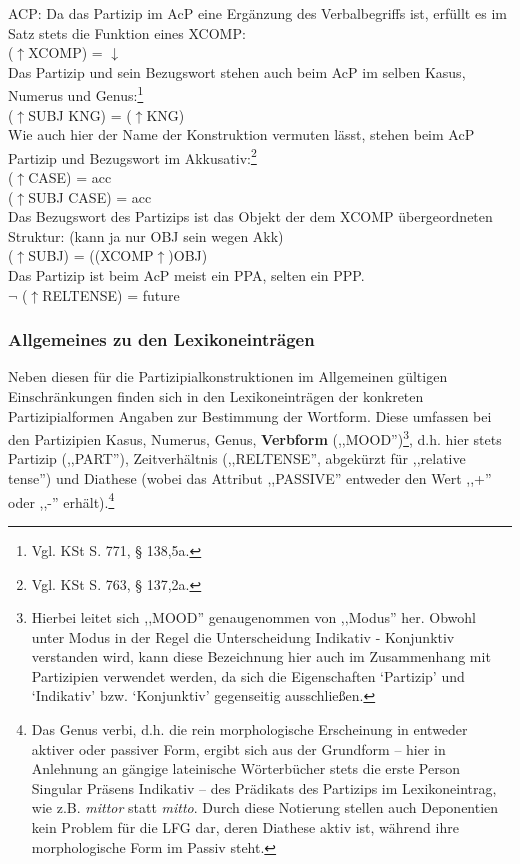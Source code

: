 \documentclass[12pt,a4paper]{article}
\begin{document}
ACP:
Da das Partizip im AcP eine Ergänzung des Verbalbegriffs ist, erfüllt es im Satz stets die Funktion eines XCOMP: \\
($\uparrow$XCOMP) = $\downarrow$ \\
Das Partizip und sein Bezugswort stehen auch beim AcP im selben Kasus, Numerus und Genus:\footnote{Vgl. KSt S. 771, § 138,5a.}\\
($\uparrow$SUBJ KNG) = ($\uparrow$KNG)\\
Wie auch hier der Name der Konstruktion vermuten lässt, stehen beim AcP Partizip und Bezugswort im Akkusativ:\footnote{Vgl. KSt S. 763, § 137,2a.} \\
($\uparrow$CASE) = acc \\
($\uparrow$SUBJ CASE) = acc \\
Das Bezugswort des Partizips ist das Objekt der dem XCOMP übergeordneten Struktur: (kann ja nur OBJ sein wegen Akk) \\
	($\uparrow$SUBJ) = ((XCOMP$\uparrow$)OBJ) \\

Das Partizip ist beim AcP meist ein PPA, selten ein PPP. \\
$\neg$ ($\uparrow$RELTENSE) = future \\

\subsubsection{Allgemeines zu den Lexikoneinträgen}

Neben diesen für die Partizipialkonstruktionen im Allgemeinen gültigen Einschränkungen finden sich in den Lexikoneinträgen der konkreten Partizipialformen Angaben zur Bestimmung der Wortform. Diese umfassen bei den Partizipien Kasus, Numerus, Genus, \textbf{Verbform} (,,MOOD'')\footnote{Hierbei leitet sich ,,MOOD'' genaugenommen von ,,Modus'' her. Obwohl unter Modus in der Regel die Unterscheidung Indikativ - Konjunktiv verstanden wird, kann diese Bezeichnung hier 	auch im Zusammenhang mit Partizipien verwendet werden, da sich die Eigenschaften `Partizip' und `Indikativ' bzw. `Konjunktiv' gegenseitig ausschließen.}, d.h. hier stets Partizip (,,PART''), Zeitverhältnis (,,RELTENSE'', abgekürzt für ,,relative tense'') und Diathese (wobei das Attribut ,,PASSIVE'' entweder den Wert ,,+'' oder ,,-'' erhält).\footnote{Das Genus verbi, d.h. die rein morphologische Erscheinung in entweder aktiver oder passiver Form, ergibt sich aus der Grundform -- hier in Anlehnung an gängige lateinische Wörterbücher stets die erste Person Singular Präsens Indikativ -- des Prädikats des Partizips im Lexikoneintrag, wie z.B. \textit{mittor} statt \textit{mitto}. Durch diese Notierung stellen auch Deponentien kein Problem für die LFG dar, deren Diathese aktiv ist, während ihre morphologische Form im Passiv steht.} \\
\end{document}

